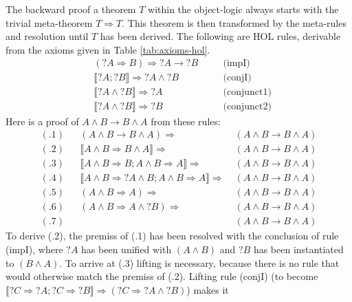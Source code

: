 \begin{expl}
  The backward proof a theorem $T$ within the object-logic always starts with
  the trivial meta-theorem $T \Longrightarrow T$. This theorem is then transformed
  by the meta-rules and resolution until  $T$ has been derived. The following
  are HOL rules, derivable from the axioms given in Table \ref{tab:axioms-hol}. 
  \begin{align*}
    &    (?A \Longrightarrow B) \Longrightarrow {}?A \longrightarrow {}?B && \quad \text{(impI)}\\
    & \llbracket?A; {}?B\rrbracket \Longrightarrow {}?A \land{} ?B    & & \quad \text{(conjI)}\\
    & \llbracket?A \land {}?B\rrbracket \Longrightarrow {}?A        && \quad \text{(conjunct1)}\\
    & \llbracket?A \land {}?B\rrbracket \Longrightarrow {}?B       && \quad \text{(conjunct2)}
  \end{align*}
  Here is  a proof of $A\land B \longrightarrow B \land A$ from these rules:
  \begin{align*}
    (.1) &&   (A\land B \longrightarrow B\land A) \Longrightarrow&\; (A\land B \longrightarrow B\land A)       \\
    (.2) &&      \llbracket A\land B \Longrightarrow B\land A\rrbracket \Longrightarrow&\; (A\land B \longrightarrow B\land A)       \\
    (.3) &&     \llbracket A\land B \Longrightarrow B; A\land B \Longrightarrow A\rrbracket \Longrightarrow&\; (A\land B \longrightarrow B\land A) \\
    (.4) &&     \llbracket A\land B \Longrightarrow ?A\land B; A\land B \Longrightarrow A\rrbracket \Longrightarrow&\; (A\land B \longrightarrow B\land A)   \\
    (.5) &&     (A\land B \Longrightarrow A) \Longrightarrow&\; (A\land B \longrightarrow B\land A)      \\
    (.6) &&     (A\land B \Longrightarrow A \land{} ?B) \Longrightarrow&\; (A\land B \longrightarrow B\land A) \\
    (.7) &&     & \;(A\land B \longrightarrow B\land A)
  \end{align*}
  To derive (.2), the premiss of (.1) has been resolved with the conclusion of
  rule (impI), where $?A$ has been unified with $(A\land B)$ and $?B$ has been
  instantiated to $(B\land A)$. To arrive at (.3) lifting is necessary, because there
  is no rule that would otherwise match the premiss of (.2). Lifting rule
  (conjI) (to become $\llbracket?C \Longrightarrow {}?A; ?C \Longrightarrow {}?B\rrbracket \Longrightarrow (?C \Longrightarrow {}?A \land{} ?B)$) makes it

\end{expl}
